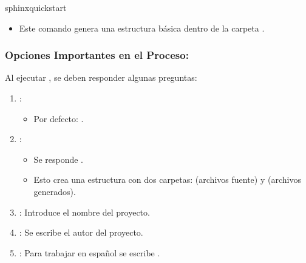 \documentclass[a4paper,10pt,oneside,spanish,openany]{sphinxmanual}
\begin{document}
\begin{sphinxVerbatim}[commandchars=\\\{\}]
sphinx\PYGZhy{}quickstart
\end{sphinxVerbatim}
\begin{itemize}
\item {} 
\sphinxAtStartPar
Este comando genera una estructura básica dentro de la carpeta .

\end{itemize}


\subsubsection{Opciones Importantes en el Proceso:}
\label{\detokenize{configuracion_inicial/003.Creacion_proyecto_Sphinx:opciones-importantes-en-el-proceso}}
\sphinxAtStartPar
Al ejecutar , se deben responder algunas preguntas:
\begin{enumerate}
%
\item {} 
\sphinxAtStartPar
{}:
\begin{itemize}
\item {} 
\sphinxAtStartPar
Por defecto: .

\end{itemize}

\item {} 
\sphinxAtStartPar
{}:
\begin{itemize}
\item {} 
\sphinxAtStartPar
Se responde .

\item {} 
\sphinxAtStartPar
Esto crea una estructura con dos carpetas:  (archivos fuente) y  (archivos generados).

\end{itemize}

\item {} 
\sphinxAtStartPar
{}: Introduce el nombre del proyecto.

\item {} 
\sphinxAtStartPar
{}: Se escribe el autor del proyecto.

\item {} 
\sphinxAtStartPar
{}:  Para trabajar en español se escribe .

\end{enumerate}
\end{document}
